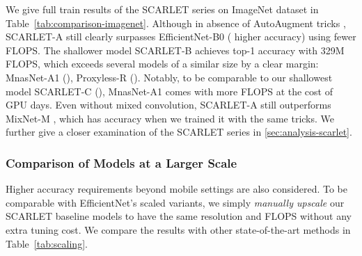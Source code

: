 \documentclass[runningheads]{llncs}
\begin{document}
We give full train results of the SCARLET series on ImageNet dataset in Table~\ref{tab:comparison-imagenet}. Although in absence of AutoAugment tricks \cite{cubuk2018autoaugment}, SCARLET-A still clearly surpasses EfficientNet-B0  ( higher accuracy)  using fewer FLOPS.  The shallower model SCARLET-B achieves  top-1 accuracy with 329M FLOPS, which exceeds several models of a similar size by a clear margin: MnasNet-A1 (), Proxyless-R (). Notably, to be comparable to our shallowest model SCARLET-C (), MnasNet-A1 comes with  more FLOPS at the cost of  GPU days. Even without mixed convolution, SCARLET-A  still outperforms MixNet-M \cite{tan2020mixconv}, which has  accuracy when we trained it with the same tricks.
We further give a closer examination of the SCARLET series in \ref{sec:analysis-scarlet}.

\subsubsection{Comparison of Models at a Larger Scale}
Higher accuracy requirements beyond mobile settings are also considered. To be comparable with EfficientNet's scaled variants, we simply \emph{manually upscale} our SCARLET baseline models to have the same resolution and FLOPS without any extra tuning cost. We compare the results with other state-of-the-art methods in Table~\ref{tab:scaling}. 
\end{document}

